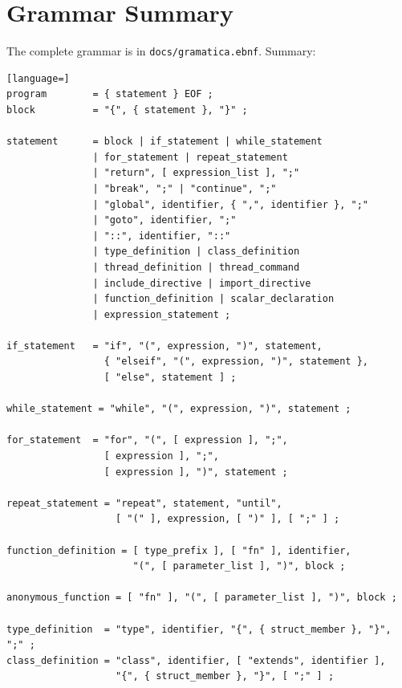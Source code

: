 \documentclass[11pt,a4paper,oneside]{report}
\newcommand{\file}[1]{\texttt{#1}}
\begin{document}
\appendix

\chapter{Grammar Summary}
\label{ap:gramatica}

The complete grammar is in \file{docs/gramatica.ebnf}. Summary:

\begin{lstlisting}[language=]
program        = { statement } EOF ;
block          = "{", { statement }, "}" ;

statement      = block | if_statement | while_statement
               | for_statement | repeat_statement
               | "return", [ expression_list ], ";"
               | "break", ";" | "continue", ";"
               | "global", identifier, { ",", identifier }, ";"
               | "goto", identifier, ";"
               | "::", identifier, "::"
               | type_definition | class_definition
               | thread_definition | thread_command
               | include_directive | import_directive
               | function_definition | scalar_declaration
               | expression_statement ;

if_statement   = "if", "(", expression, ")", statement,
                 { "elseif", "(", expression, ")", statement },
                 [ "else", statement ] ;

while_statement = "while", "(", expression, ")", statement ;

for_statement  = "for", "(", [ expression ], ";",
                 [ expression ], ";",
                 [ expression ], ")", statement ;

repeat_statement = "repeat", statement, "until",
                   [ "(" ], expression, [ ")" ], [ ";" ] ;

function_definition = [ type_prefix ], [ "fn" ], identifier,
                      "(", [ parameter_list ], ")", block ;

anonymous_function = [ "fn" ], "(", [ parameter_list ], ")", block ;

type_definition  = "type", identifier, "{", { struct_member }, "}", ";" ;
class_definition = "class", identifier, [ "extends", identifier ],
                   "{", { struct_member }, "}", [ ";" ] ;
\end{lstlisting}
\end{document}
